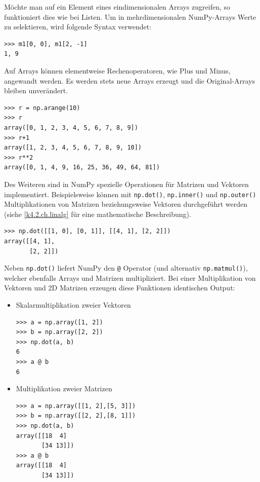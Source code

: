 \documentclass[]{dsadokumentation}
\begin{document}
Möchte man auf ein Element eines eindimensionalen Arrays zugreifen, so funktioniert dies wie bei Listen. Um in mehrdimensionalen NumPy-Arrays Werte zu selektieren, wird folgende Syntax verwendet:

\begin{verbatim}
>>> m1[0, 0], m1[2, -1]
1, 9
\end{verbatim}

Auf Arrays können elementweise Rechenoperatoren, wie Plus und Minus, angewandt werden. Es werden stets neue Arrays erzeugt und die Original-Arrays bleiben unverändert.

\begin{verbatim}
>>> r = np.arange(10)
>>> r
array([0, 1, 2, 3, 4, 5, 6, 7, 8, 9])
>>> r+1
array([1, 2, 3, 4, 5, 6, 7, 8, 9, 10])
>>> r**2
array([0, 1, 4, 9, 16, 25, 36, 49, 64, 81])
\end{verbatim}

Des Weiteren sind in NumPy spezielle Operationen für Matrizen und Vektoren implementiert. Beispielsweise können mit \verb|np.dot()|, \verb|np.inner()| und \verb|np.outer()| Multiplikationen von Matrizen beziehungsweise Vektoren durchgeführt werden (siehe \cref{k4.2.ch.linalg} für eine mathematische Beschreibung).

\begin{verbatim}
>>> np.dot([[1, 0], [0, 1]], [[4, 1], [2, 2]])
array([[4, 1],
       [2, 2]])
\end{verbatim}

Neben \verb|np.dot()| liefert NumPy den \verb|@| Operator (und alternativ \verb|np.matmul()|), welcher ebenfalls Arrays und Matrizen multipliziert.
Bei einer Multiplikation von Vektoren und 2D Matrizen erzeugen diese Funktionen identischen Output:

\begin{itemize}
    \item Skalarmultiplikation zweier Vektoren

        \begin{verbatim}
>>> a = np.array([1, 2])
>>> b = np.array([2, 2])
>>> np.dot(a, b)
6
>>> a @ b
6
\end{verbatim}

  \item Multiplikation zweier Matrizen

        \begin{verbatim}
>>> a = np.array([[1, 2],[5, 3]])
>>> b = np.array([[2, 2],[8, 1]])
>>> np.dot(a, b)
array([[18  4]
       [34 13]])
>>> a @ b
array([[18  4]
       [34 13]])
\end{verbatim}

\end{itemize}
\end{document}
